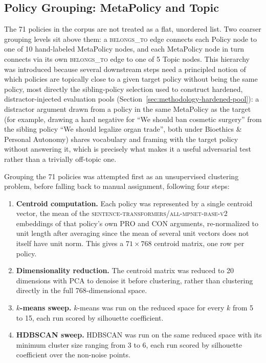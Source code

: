 \subsection{Policy Grouping: MetaPolicy and Topic}
\label{sec:methodology-metapolicy}

The 71 policies in the corpus are not treated as a flat, unordered list. Two coarser grouping
levels sit above them: a \textsc{belongs\_to} edge connects each Policy node to one of 10
hand-labeled MetaPolicy nodes, and each MetaPolicy node in turn connects via its own
\textsc{belongs\_to} edge to one of 5 Topic nodes. This hierarchy was introduced because several
downstream steps need a principled notion of which policies are topically close to a given
target policy without being the same policy, most directly the sibling-policy selection used to
construct hardened, distractor-injected evaluation pools (Section~\ref{sec:methodology-hardened-pool}):
a distractor argument drawn from a policy in the same MetaPolicy as the target (for example,
drawing a hard negative for ``We should ban cosmetic surgery'' from the sibling policy ``We should
legalize organ trade'', both under Bioethics \& Personal Autonomy) shares vocabulary and framing
with the target policy without answering it, which is precisely what makes it a useful adversarial
test rather than a trivially off-topic one.

Grouping the 71 policies was attempted first as an unsupervised clustering problem, before
falling back to manual assignment, following four steps:

\begin{enumerate}
\item \textbf{Centroid computation.} Each policy was represented by a single centroid vector, the
mean of the \textsc{sentence-transformers/all-mpnet-base-v2} embeddings
\cite{reimers2019sbert,song2020mpnet} of that policy's own PRO and CON arguments, re-normalized to
unit length after averaging since the mean of several unit vectors does not itself have unit norm.
This gives a $71 \times 768$ centroid matrix, one row per policy.

\item \textbf{Dimensionality reduction.} The centroid matrix was reduced to 20 dimensions with
PCA to denoise it before clustering, rather than clustering directly in the full 768-dimensional
space.

\item \textbf{$k$-means sweep.} $k$-means was run on the reduced space for every $k$ from 5 to 15,
each run scored by silhouette coefficient.

\item \textbf{HDBSCAN sweep.} HDBSCAN \cite{campello2013hdbscan} was run on the same reduced space
with its minimum cluster size ranging from 3 to 6, each run scored by silhouette coefficient over
the non-noise points.
\end{enumerate}

